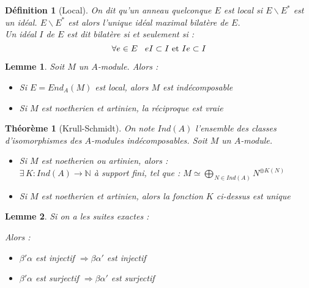 \documentclass{article}           %
\newcommand\N{\mathbb{N}}
\newcommand\opluss[2]{\underset{#1}{\overset{#2}{\bigoplus}}} 	%
\let\dummy\exists						%
\renewcommand*{\exists}{\dummy \,}
\newcommand\tq{\hspace{0.3cm}} 		%
\newcommand\noset[1]{\backslash{#1}} 	%
\theoremstyle{break}
\theoremstyle{add}
\theoremstyle{break} %
\newtheorem{theoreme}{Théorème}[section]
\newtheorem{lemme}{Lemme}[section]
\newtheorem{definition}{Définition}[section]
\theoremstyle{add}
\begin{document}
\begin{definition}[Local]
On dit qu'un anneau quelconque $E$ est local si $E\noset{E^*}$ est un idéal. $E\noset{E^*}$ est alors l'unique idéal maximal bilatère de $E$. \\
Un idéal $I$ de $E$ est dit bilatère si et seulement si :
$$ \forall e \in E \tq eI \subset I \textrm{ et } Ie \subset I$$
\end{definition}

\begin{lemme}
Soit $M$ un $A$-module. Alors :
\begin{itemize}
\item Si $E = End_A(M)$ est local, alors $M$ est indécomposable
\item Si $M$ est noetherien et artinien, la réciproque est vraie
\end{itemize}
\end{lemme}

\begin{theoreme}[Krull-Schmidt]
On note $Ind(A)$ l'ensemble des classes d'isomorphismes des $A$-modules indécomposables. Soit $M$ un $A$-module.
\begin{itemize}
\item Si $M$ est noetherien ou artinien, alors : \\
$ \exists K : Ind(A) \longrightarrow \N$ à support fini, tel que : $M \simeq \opluss{N \in Ind(A)}{} N^{\oplus K(N)}$
\item Si $M$ est noetherien et artinien, alors la fonction $K$ ci-dessus est unique
\end{itemize}
\end{theoreme}

\begin{lemme}
Si on a les suites exactes : \\


Alors :
\begin{itemize}
\item $\beta' \alpha$ est injectif $\Longrightarrow \beta \alpha'$ est injectif
\item $\beta' \alpha$ est surjectif $\Longrightarrow \beta \alpha'$ est surjectif
\end{itemize}
\end{lemme}
\end{document}
